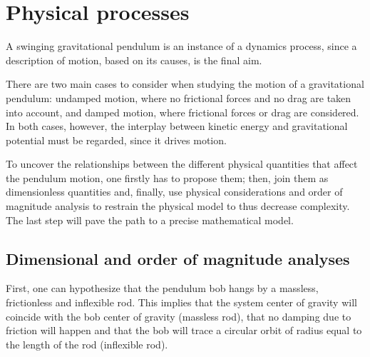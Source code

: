 \section{Physical processes}
A swinging gravitational pendulum is an instance of a dynamics process, since a description of motion, based on its causes, is the final aim. 

There are two main cases to consider when studying the motion of a gravitational pendulum: undamped motion, where no frictional forces and no drag are taken into account, and damped motion, where frictional forces or drag are considered. In both cases, however, the interplay between kinetic energy and gravitational potential must be regarded, since it drives motion.

To uncover the relationships between the different physical quantities that affect the pendulum motion, one firstly has to propose them; then, join them as dimensionless quantities and, finally, use physical considerations and order of magnitude analysis to restrain the physical model to thus decrease complexity. The last step will pave the path to a precise mathematical model.


\newcommand{\angpos}{\theta}     %
\newcommand{\angvel}{\dt\theta}  %
\newcommand{\angacc}{\ddt\theta} %


\subsection{Dimensional and order of magnitude analyses}
First, one can hypothesize that the pendulum bob hangs by a massless, frictionless and inflexible rod. This implies that the system center of gravity will coincide with the bob center of gravity (massless rod), that no damping due to friction will happen and that the bob will trace a circular orbit of radius equal to the length of the rod (inflexible rod).

